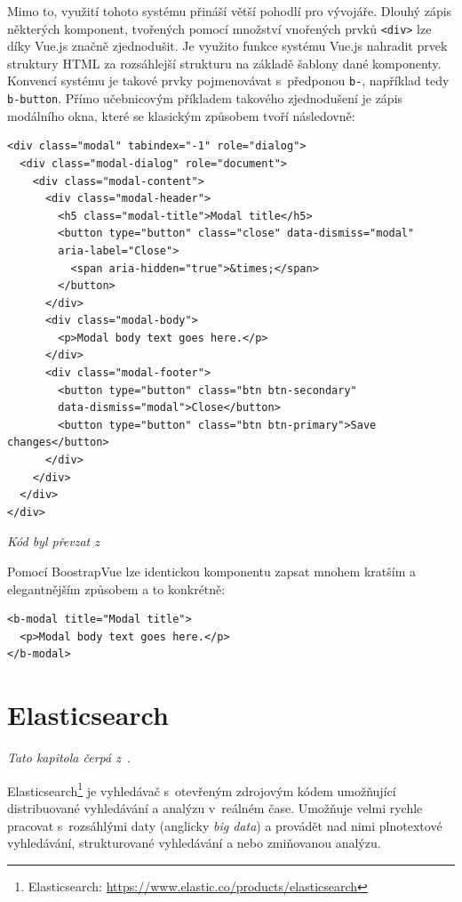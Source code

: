 Mimo to, využití tohoto systému přináší větší pohodlí pro vývojáře. Dlouhý zápis některých komponent, tvořených pomocí množství vnořených prvků \texttt{<div>} lze díky Vue.js značně zjednodušit. Je využito funkce systému Vue.js nahradit prvek struktury HTML za rozsáhlejší strukturu na základě šablony dané komponenty. Konvencí systému je takové prvky pojmenovávat s~předponou \texttt{b-}, například tedy \texttt{b-button}.
Přímo učebnicovým příkladem takového zjednodušení je zápis modálního okna, které se klasickým způsobem tvoří následovně:

\begin{verbatim}
<div class="modal" tabindex="-1" role="dialog">
  <div class="modal-dialog" role="document">
    <div class="modal-content">
      <div class="modal-header">
        <h5 class="modal-title">Modal title</h5>
        <button type="button" class="close" data-dismiss="modal"
        aria-label="Close">
          <span aria-hidden="true">&times;</span>
        </button>
      </div>
      <div class="modal-body">
        <p>Modal body text goes here.</p>
      </div>
      <div class="modal-footer">
        <button type="button" class="btn btn-secondary"
        data-dismiss="modal">Close</button>
        <button type="button" class="btn btn-primary">Save changes</button>
      </div>
    </div>
  </div>
</div>
\end{verbatim}
\emph{Kód byl převzat z~\cite{bib:bootstrap-modal}}

Pomocí BoostrapVue lze identickou komponentu zapsat mnohem kratším a elegantnějším způsobem a to konkrétně:

\begin{verbatim}
<b-modal title="Modal title">
  <p>Modal body text goes here.</p>
</b-modal>
\end{verbatim}




\section{Elasticsearch}
\emph{Tato kapitola čerpá z~\cite{bib:elastic-defnitive}}.

Elasticsearch\footnote{Elasticsearch: \url{https://www.elastic.co/products/elasticsearch}} je vyhledávač s~otevřeným zdrojovým kódem umožňující distribuované vyhledávání a analýzu v~reálném čase. Umožňuje velmi rychle pracovat s~rozsáhlými daty (anglicky \emph{big data}) a provádět nad nimi plnotextové vyhledávání, strukturované vyhledávání a nebo zmiňovanou analýzu.

